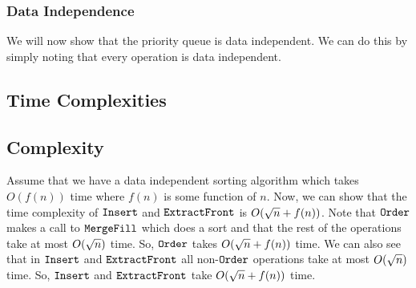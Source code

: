 \subsubsection*{Data Independence}
We will now show that the priority queue is data independent.
We can do this by simply noting that every operation is data independent.

\subsection{Time Complexities}

\subsection{Complexity}
Assume that we have a data independent sorting algorithm which takes $O(f(n))$ time where $f(n)$ is some function of $n$.
Now, we can show that the time complexity of $\texttt{Insert}$ and $\texttt{ExtractFront}$ is $O({\sqrt{n}} + f(n))$.
Note that $\texttt{Order}$ makes a call to $\texttt{MergeFill}$ which does a sort and that the rest of the operations take at most $O({\sqrt{n}})$ time.
So, $\texttt{Order}$ takes $O({\sqrt{n}} + f(n))$ time.
We can also see that in $\texttt{Insert}$ and $\texttt{ExtractFront}$ all non-$\texttt{Order}$ operations take at most $O({\sqrt{n}})$ time.
So, $\texttt{Insert}$ and $\texttt{ExtractFront}$ take $O({\sqrt{n}} + f(n))$ time.
